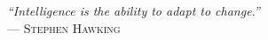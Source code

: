 


\thispagestyle{plain}

\vspace*{0.5\textheight}
\begin{flushright}
\textit{``Intelligence is the ability to adapt to change.''}\\[1em]
--- \textsc{Stephen Hawking}
\end{flushright}